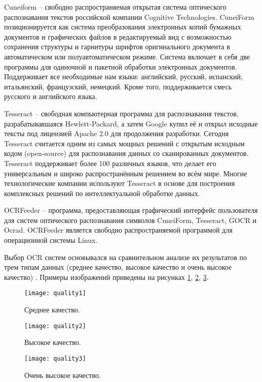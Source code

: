 Cuneiform \cite{cuneiform} -- свободно распространяемая открытая система оптического распознавания текстов российской компании Cognitive Technologies. CuneiForm позиционируется как система преобразования электронных копий бумажных документов и графических файлов в редактируемый вид с возможностью сохранения структуры и гарнитуры шрифтов оригинального документа в автоматическом или полуавтоматическом режиме. Система включает в себя две программы для одиночной и пакетной обработки электронных документов. Поддерживает все необходимые нам языки: английский, русский, испанский, итальянский, французский, немецкий. Кроме того, поддерживается смесь русского и английского языка. 

Tesseract \cite{tesseract} -- свободная компьютерная программа для распознавания текстов, разрабатывавшаяся Hewlett-Packard, а затем Google купил её и открыл исходные тексты под лицензией Apache 2.0 для продолжения разработки. Сегодня Tesseract считается одним из самых мощных решений с открытым исходным кодом (open-source) для распознавания данных со сканированных документов. Tesseract поддерживает более 100 различных языков, что делает его универсальным и широко распространённым решением во всём мире. Многие технологические компании используют Tesseract в основе для построения комплексных решений по интеллектуальной обработке данных.

OCRFeeder \cite{ocrfeeder} -- программа, предоставляющая графический интерфейс пользователя для систем оптического распознавания символов CuneiForm, Tesseract, GOCR и Ocrad. OCRFeeder является свободно распространяемой программой для операционной системы Linux.

Выбор OCR систем основывался на сравнительном анализе их результатов по трем типам данных (среднее качество, высокое качество и очень высокое качество) \cite{textocr}. Примеры изображений приведены на рисунках \ref{img:quality1}, \ref{img:quality2}, \ref{img:quality3}.

\begin{figure}[H]
	\centering
	\texttt{[image: quality1]}
	\caption{Среднее качество. }
	\label{img:quality1}
\end{figure}

\begin{figure}[H]
	\centering
	\texttt{[image: quality2]}
	\caption{Высокое качество. }
	\label{img:quality2}
\end{figure}

\begin{figure}[H]
	\centering
	\texttt{[image: quality3]}
	\caption{Очень высокое качество. }
	\label{img:quality3}
\end{figure}

